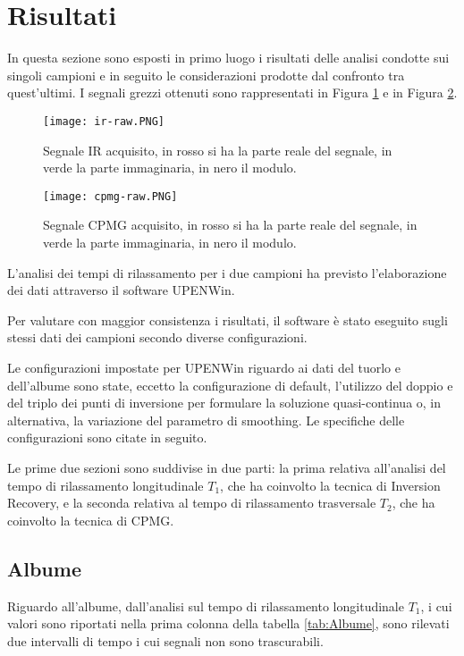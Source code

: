 \section*{Risultati}
In questa sezione sono esposti in primo luogo i risultati delle analisi condotte sui singoli campioni e in seguito le considerazioni prodotte dal confronto tra quest'ultimi. I segnali grezzi ottenuti sono rappresentati in Figura \ref{fig:ir-raw} e in Figura \ref{fig:cpmg-raw}.

\begin{figure}[ht]
\texttt{[image: ir-raw.PNG]}
\caption{Segnale IR acquisito, in rosso si ha la parte reale del segnale, in verde la parte immaginaria, in nero il modulo.}\label{fig:ir-raw}
\end{figure}

\begin{figure}
\texttt{[image: cpmg-raw.PNG]}
\caption{Segnale CPMG acquisito, in rosso si ha la parte reale del segnale, in verde la parte immaginaria, in nero il modulo.}\label{fig:cpmg-raw}
\end{figure} 

L'analisi dei tempi di rilassamento per i due campioni ha previsto l'elaborazione dei dati attraverso il software UPENWin.

Per valutare con maggior consistenza i risultati, il software è stato eseguito sugli stessi dati dei campioni secondo diverse configurazioni.

Le configurazioni impostate per UPENWin riguardo ai dati del tuorlo e dell'albume sono state, eccetto la configurazione di default, l'utilizzo del doppio e del triplo dei punti di inversione per formulare la soluzione quasi-continua o, in alternativa, la variazione del parametro di smoothing. 
Le specifiche delle configurazioni sono citate in seguito. 

Le prime due sezioni sono suddivise in due parti: la prima relativa all'analisi del tempo di rilassamento longitudinale $T_1$, che ha coinvolto la tecnica di Inversion Recovery, e la seconda relativa al tempo di rilassamento trasversale $T_2$, che ha coinvolto la tecnica di CPMG.

\subsection*{Albume} 

Riguardo all'albume, dall'analisi sul tempo di rilassamento longitudinale $T_1$, i cui valori sono riportati nella prima colonna della tabella \ref{tab:Albume}, sono rilevati due intervalli di tempo i cui segnali non sono trascurabili. 

